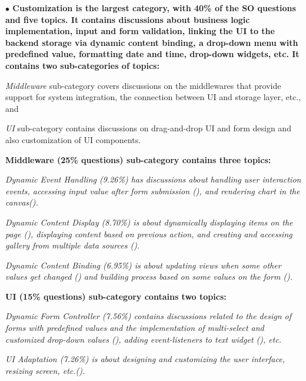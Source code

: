 \nd\bf{$\bullet$ Customization} is the largest category, with 40\% of the SO questions and five topics. It contains discussions about business
logic implementation, input and form validation, linking the UI to the backend
storage via dynamic content binding, a drop-down menu with predefined value,
formatting date and time, drop-down widgets, etc. It contains two sub-categories
of topics: 
\begin{inparaenum}[(1)] 
    \item \textit{Middleware} sub-category covers discussions on the middlewares that
provide support for system integration, the connection between UI and storage layer, etc., and 
    \item \textit{UI} sub-category contains discussions
on drag-and-drop UI and form design and also customization of UI components.
\end{inparaenum}

\begin{inparaenum}[(i)]
    \item \bf{{Middleware (25\% questions)}} sub-category contains three topics:
    \begin{inparaenum}[(1)] \item \it{Dynamic Event Handling (9.26\%)} has
    discussions about handling user interaction events, accessing input
    value after form submission (), and rendering chart in the
    canvas().
    \item \it{Dynamic Content Display (8.70\%)} is about dynamically displaying
    items on the page (), displaying content based on previous action, and creating and accessing gallery from multiple data sources ().
    \item \it{Dynamic Content Binding (6.95\%)} is about updating views when some
    other values get changed () and building process based on some values
    on the form ().
    \end{inparaenum} 
    
    \item \bf{{UI (15\% questions)}} sub-category contains two topics:
    \begin{inparaenum}[(1)] \item \it{Dynamic Form Controller (7.56\%)} contains
    discussions related to the design of forms with predefined values and the implementation of multi-select and customized drop-down values (), adding event-listeners to text
    widget (), etc.
    \item \it{UI Adaptation (7.26\%)} is about designing and customizing the user
    interface, resizing screen, etc.().
    \end{inparaenum} 
\end{inparaenum}

